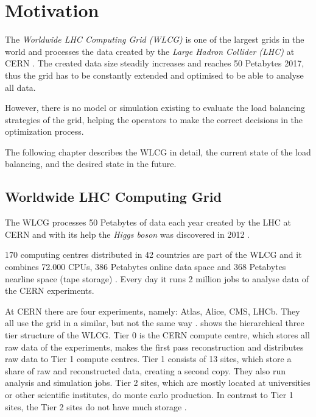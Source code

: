 
\chapter{Motivation}
The \textit{Worldwide LHC Computing Grid (WLCG)} is one of the largest grids in the world and processes the data created by the \textit{Large Hadron Collider (LHC)} at CERN \cite{wlcg_update}. 
The created data size steadily increases and reaches 50 Petabytes 2017, thus the grid has to be constantly extended and optimised to be able to analyse all data.

However, there is no model or simulation existing to evaluate the load balancing strategies of the grid,
helping the operators to make the correct decisions in the optimization process.

The following chapter describes the WLCG in detail, the current state of the load balancing, and the desired state in the future.

\section{Worldwide LHC Computing Grid}

The WLCG processes 50 Petabytes of data each year created by the LHC at CERN \cite{data_process}
and with its help the \textit{Higgs boson} was discovered in 2012 \cite{wlcg_online}.

170 computing centres distributed in 42 countries are part of the WLCG and it combines 72.000 CPUs, 386 Petabytes online data space and 368 Petabytes nearline space (tape storage) \cite{wlcg_data}. Every day it runs 2 million jobs to analyse data of the CERN experiments.

At CERN there are four experiments, namely: Atlas, Alice, CMS, LHCb. They all use the grid in a similar, but not the same way \cite{wlcg_computing}.  shows the hierarchical three tier structure of the WLCG. Tier 0 is the CERN compute centre, which stores all raw data of the experiments, makes the first pass reconstruction and distributes raw data to Tier 1 compute centres. Tier 1 consists of 13 sites, which store a share of raw and reconstructed data, creating a second copy. They also run analysis and simulation jobs. Tier 2 sites, which are mostly located at universities or other scientific institutes, do monte carlo production. In contrast to Tier 1 sites, the Tier 2 sites do not have much storage \cite{wlcg_computing}.

